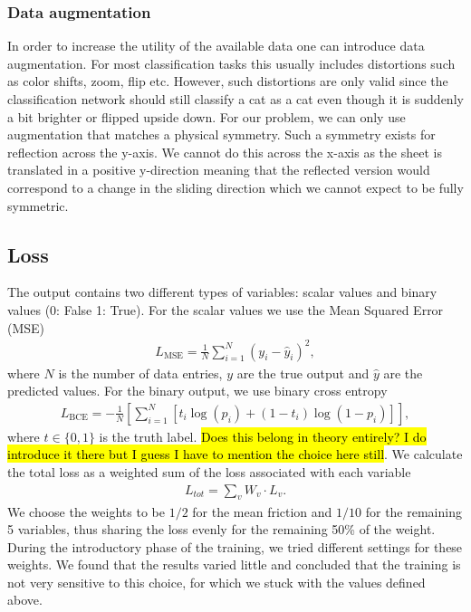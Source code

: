 \subsubsection{Data augmentation}
In order to increase the utility of the available data one can introduce data augmentation. For most classification tasks this usually includes distortions such as color shifts, zoom, flip etc. However, such distortions are only valid since the classification network should still classify a cat as a cat even though it is suddenly a bit brighter or flipped upside down. For our problem, we can only use augmentation that matches a physical symmetry. Such a symmetry exists for reflection across the y-axis. We cannot do this across the
x-axis as the sheet is translated in a positive y-direction meaning that the reflected version would correspond to a change in the sliding direction which we cannot expect to be fully symmetric. 


\subsection{Loss}\label{sec:loss}
The output contains two different types of variables: scalar values and binary values (0: False 1: True). For the scalar values we use the Mean Squared Error (\acrshort{MSE})
\begin{align*}
  L_{\text{MSE}} = \frac{1}{N} \sum_{i = 1}^N (y_i - \hat{y}_i)^2,
\end{align*}
where $N$ is the number of data entries, $y$ are the true output and
$\hat{y}$ are the predicted values. For the binary output, we use binary cross entropy 
\begin{align*}
  L_{\text{BCE}} = -\frac{1}{N} \left[\sum_{i = 1}^N [t_i\log{(p_i)} + (1-t_i)\log{(1 - p_i)}]\right],
\end{align*}
where $t\in \{0,1\}$ is the truth label. \hl{Does this belong in theory
entirely? I do introduce it there but I guess I have to mention the choice here still}. We calculate the total loss as a weighted sum of the loss associated with
each variable
\begin{align*}
  L_{tot} = \sum_{v} W_v\cdot L_v.
\end{align*}
We choose the weights to be $1/2$ for the mean friction and $1/10$ for the
remaining 5 variables, thus sharing the loss evenly for the remaining 50\% of the weight. During the introductory phase of the training, we tried different settings for these weights. We found that the results varied little and concluded that the training is not very sensitive to this choice, for which we stuck with the values defined above.

